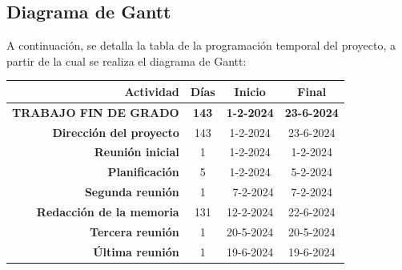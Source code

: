   \subsection{Diagrama de Gantt}

  A continuación, se detalla la tabla de la programación temporal del proyecto, a partir de la cual se realiza el diagrama de Gantt:

  \begin{table}[!h]
    \centering
    \begin{tabular}{|r|c|c|c|}
    \hline
    \rowcolor[HTML]{CBCEFB} 
    \textbf{Actividad}                                           & \textbf{Días}             & \textbf{Inicio}                   & \textbf{Final}                    \\ \hline
    \rowcolor[HTML]{FFCCC9} 
    \textbf{TRABAJO FIN DE GRADO}                                & \textbf{143}              & \textbf{1-2-2024}                 & \textbf{23-6-2024}                \\ \hline
    \rowcolor[HTML]{FFCE93} 
    \textbf{Dirección del proyecto}                              & 143                       & 1-2-2024                          & 23-6-2024                         \\ \hline
    \rowcolor[HTML]{CBE5CB} 
    \textbf{Reunión inicial}                                     & 1                         & 1-2-2024                          & \cellcolor[HTML]{CBE5CB}1-2-2024  \\ \hline
    \rowcolor[HTML]{CBE5CB} 
    \textbf{Planificación}                                       & 5                         & \cellcolor[HTML]{CBE5CB}1-2-2024  & \cellcolor[HTML]{CBE5CB}5-2-2024  \\ \hline
    \rowcolor[HTML]{CBE5CB} 
    \textbf{Segunda reunión} &
      \cellcolor[HTML]{CBE5CB}1 &
      \multicolumn{1}{r|}{\cellcolor[HTML]{CBE5CB}7-2-2024} &
      \cellcolor[HTML]{CBE5CB}7-2-2024 \\ \hline
    \rowcolor[HTML]{CBE5CB} 
    \cellcolor[HTML]{CBE5CB}\textbf{Redacción de la memoria}     & 131                       & 12-2-2024                         & 22-6-2024                         \\ \hline
    \rowcolor[HTML]{CBE5CB} 
    \textbf{Tercera reunión}                                     & 1                         & 20-5-2024                         & \cellcolor[HTML]{CBE5CB}20-5-2024 \\ \hline
    \rowcolor[HTML]{CBE5CB} 
    \textbf{Última reunión}                                      & 1                         & 19-6-2024                         & 19-6-2024                         \\ \hline

\end{tabular}
\end{table}
